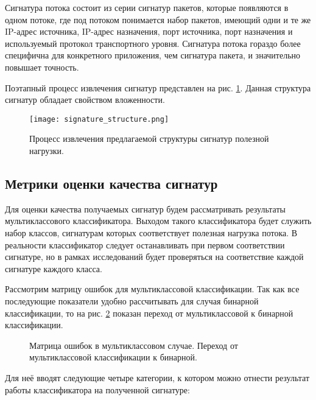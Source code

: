 Сигнатура потока состоит из серии сигнатур пакетов, которые появляются в одном потоке, где под потоком понимается набор пакетов,
имеющий одни и те же IP-адрес источника, IP-адрес назначения, порт источника, порт назначения и
используемый протокол транспортного уровня. Сигнатура потока гораздо более специфична для конкретного приложения,
чем сигнатура пакета, и значительно повышает точность.

Поэтапный процесс извлечения сигнатур представлен на рис. \ref{signature_process}.
Данная структура сигнатур обладает свойством вложенности.

\begin{figure}[H]
    \begin{center}
        \texttt{[image: signature\_structure.png]}
        \caption{Процесс извлечения предлагаемой структуры сигнатур полезной нагрузки.}\label{signature_process}
    \end{center}
\end{figure}

\subsection{Метрики оценки качества сигнатур}

Для оценки качества получаемых сигнатур будем рассматривать результаты мультиклассового классификатора.
Выходом такого классификатора будет служить набор классов, сигнатурам которых соответствует полезная нагрузка потока.
В реальности классификатор следует останавливать при первом соответствии сигнатуре,
но в рамках исследований будет проверяться на соответствие каждой сигнатуре каждого класса.

Рассмотрим матрицу ошибок для мультиклассовой классификации. Так как все последующие показатели удобно рассчитывать
для случая бинарной классификации, то на рис. \ref{ConfusionMatrix} показан переход от мультиклассовой к бинарной классификации.

\begin{figure}[h!]
    \begin{center}
        
        \caption{Матрица ошибок в мультиклассовом случае. Переход от мультиклассовой классификации к бинарной.} \label{ConfusionMatrix}
    \end{center}
\end{figure}

Для неё вводят следующие четыре категории, к котором можно отнести результат работы классификатора на полученной сигнатуре:

